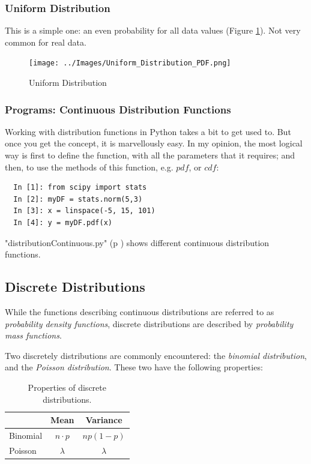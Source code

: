 \subsubsection{Uniform Distribution}

This is a simple one: an even probability for all data values (Figure \ref{fig:uniform}). Not very common for real data.

\begin{figure}
  \centering
  \texttt{[image: ../Images/Uniform\_Distribution\_PDF.png]}\\
  \caption{Uniform Distribution} \label{fig:uniform}
\end{figure}

\subsubsection{Programs: Continuous Distribution Functions}

Working with distribution functions in Python takes a bit to get used to. But once you get the concept, it is marvellously easy. In my opinion, the most logical way is first to define the function, with all the parameters that it requires; and then, to use the methods of this function, e.g. $pdf$, or $cdf$:

\begin{lstlisting}
  In [1]: from scipy import stats
  In [2]: myDF = stats.norm(5,3)
  In [3]: x = linspace(-5, 15, 101)
  In [4]: y = myDF.pdf(x)
\end{lstlisting}

\PyImg "distributionContinuous.py" (p \pageref{py:continuous}) shows different continuous distribution functions.

\subsection{Discrete Distributions}

While the functions describing continuous distributions are referred to as \emph{probability density functions}, discrete distributions are described by \emph{probability mass functions}.

Two discretely distributions are commonly encountered: the \emph{binomial distribution}, and the \emph{Poisson distribution}. These two have the following properties:

\begin{table}[h]
  \centering
  \begin{tabular}{l|c|c|}
      & Mean & Variance \\
      \hline
      Binomial & $n \cdot p$ & $np(1-p)$ \\
      Poisson & $\lambda$ & $\lambda$ \\
  \end{tabular}
\caption{Properties of discrete distributions.}
\end{table}

